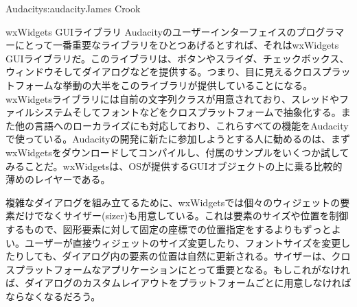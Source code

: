 \begin{aosachapter}{Audacity}{s:audacity}{James Crook}
\begin{aosasect1}{wxWidgets GUIライブラリ}
Audacityのユーザーインターフェイスのプログラマーにとって一番重要なライブラリをひとつあげるとすれば、それはwxWidgets GUIライブラリだ。このライブラリは、ボタンやスライダ、チェックボックス、ウィンドウそしてダイアログなどを提供する。つまり、目に見えるクロスプラットフォームな挙動の大半をこのライブラリが提供していることになる。wxWidgetsライブラリには自前の文字列クラスが用意されており、スレッドやファイルシステムそしてフォントなどをクロスプラットフォームで抽象化する。また他の言語へのローカライズにも対応しており、これらすべての機能をAudacityで使っている。Audacityの開発に新たに参加しようとする人に勧めるのは、まずwxWidgetsをダウンロードしてコンパイルし、付属のサンプルをいくつか試してみることだ。wxWidgetsは、OSが提供するGUIオブジェクトの上に乗る比較的薄めのレイヤーである。

複雑なダイアログを組み立てるために、wxWidgetsでは個々のウィジェットの要素だけでなくサイザー(sizer)も用意している。これは要素のサイズや位置を制御するもので、図形要素に対して固定の座標での位置指定をするよりもずっとよい。ユーザーが直接ウィジェットのサイズ変更したり、フォントサイズを変更したりしても、ダイアログ内の要素の位置は自然に更新される。サイザーは、クロスプラットフォームなアプリケーションにとって重要となる。もしこれがなければ、ダイアログのカスタムレイアウトをプラットフォームごとに用意しなければならなくなるだろう。


\end{aosasect1}
\end{aosachapter}
